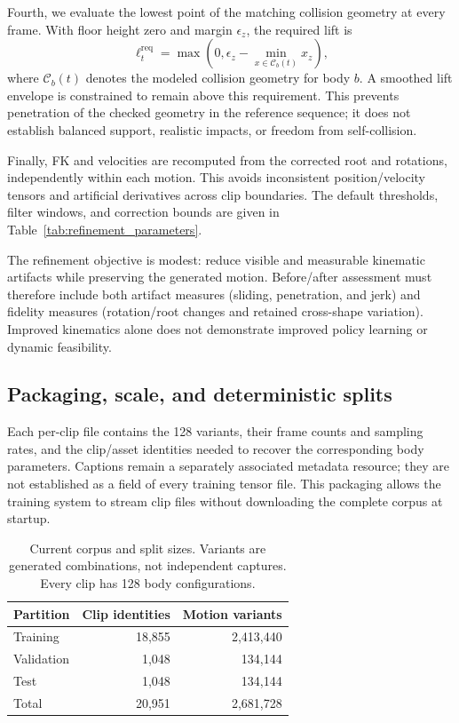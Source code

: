 \documentclass[11pt]{article}
\begin{document}
Fourth, we evaluate the lowest point of the matching collision geometry at
every frame. With floor height zero and margin $\epsilon_z$, the required lift is
\begin{equation}
    \ell_t^{\mathrm{req}}
      = \max\!\left(0,\epsilon_z-\min_{x\in\mathcal{C}_b(t)}x_z\right),
    \label{eq:clearance}
\end{equation}
where $\mathcal{C}_b(t)$ denotes the modeled collision geometry for body $b$.
A smoothed lift envelope is constrained to remain above this requirement.
This prevents penetration of the checked geometry in the reference sequence;
it does not establish balanced support, realistic impacts, or freedom from
self-collision.

Finally, FK and velocities are recomputed from the corrected root and
rotations, independently within each motion. This avoids inconsistent
position/velocity tensors and artificial derivatives across clip boundaries.
The default thresholds, filter windows, and correction bounds are given in
Table~\ref{tab:refinement_parameters}.

The refinement objective is modest: reduce visible and measurable kinematic
artifacts while preserving the generated motion. Before/after assessment must
therefore include both artifact measures (sliding, penetration, and jerk) and
fidelity measures (rotation/root changes and retained cross-shape variation).
Improved kinematics alone does not demonstrate improved policy learning or
dynamic feasibility.

\subsection{Packaging, scale, and deterministic splits}\label{sec:splits}

Each per-clip file contains the 128 variants, their frame counts and sampling
rates, and the clip/asset identities needed to recover the corresponding body
parameters. Captions remain a separately associated metadata resource; they
are not established as a field of every training tensor file. This packaging
allows the training system to stream clip files without downloading the
complete corpus at startup.

\begin{table}[t]
\centering
\caption{Current corpus and split sizes. Variants are generated combinations,
not independent captures. Every clip has 128 body configurations.}\label{tab:dataset_counts}
\begin{tabular}{lrr}
\toprule
Partition & Clip identities & Motion variants \\
\midrule
Training & 18,855 & 2,413,440 \\
Validation & 1,048 & 134,144 \\
Test & 1,048 & 134,144 \\
\midrule
Total & 20,951 & 2,681,728 \\
\bottomrule
\end{tabular}
\end{table}
\end{document}
